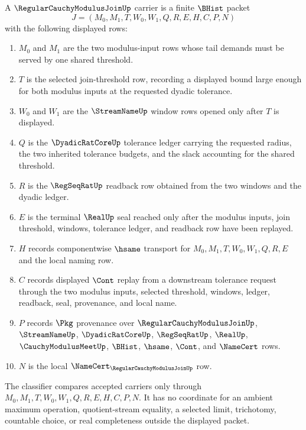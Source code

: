 \begin{definition}
\label{def:regular-cauchy-modulus-join-carrier}
A $\RegularCauchyModulusJoinUp$ carrier is a finite $\BHist$ packet
$$
J=(M_0,M_1,T,W_0,W_1,Q,R,E,H,C,P,N)
$$
with the following displayed rows:
\begin{enumerate}
\item $M_0$ and $M_1$ are the two modulus-input rows whose tail demands must be served by one shared threshold.
\item $T$ is the selected join-threshold row, recording a displayed bound large enough for both modulus inputs at the requested dyadic tolerance.
\item $W_0$ and $W_1$ are the $\StreamNameUp$ window rows opened only after $T$ is displayed.
\item $Q$ is the $\DyadicRatCoreUp$ tolerance ledger carrying the requested radius, the two inherited tolerance budgets, and the slack accounting for the shared threshold.
\item $R$ is the $\RegSeqRatUp$ readback row obtained from the two windows and the dyadic ledger.
\item $E$ is the terminal $\RealUp$ seal reached only after the modulus inputs, join threshold, windows, tolerance ledger, and readback row have been replayed.
\item $H$ records componentwise $\hsame$ transport for $M_0,M_1,T,W_0,W_1,Q,R,E$ and the local naming row.
\item $C$ records displayed $\Cont$ replay from a downstream tolerance request through the two modulus inputs, selected threshold, windows, ledger, readback, seal, provenance, and local name.
\item $P$ records $\Pkg$ provenance over $\RegularCauchyModulusJoinUp$, $\StreamNameUp$, $\DyadicRatCoreUp$, $\RegSeqRatUp$, $\RealUp$, $\CauchyModulusMeetUp$, $\BHist$, $\hsame$, $\Cont$, and $\NameCert$ rows.
\item $N$ is the local $\NameCert_{\RegularCauchyModulusJoinUp}$ row.
\end{enumerate}
The classifier compares accepted carriers only through $M_0,M_1,T,W_0,W_1,Q,R,E,H,C,P,N$. It has no coordinate for an ambient maximum operation, quotient-stream equality, a selected limit, trichotomy, countable choice, or real completeness outside the displayed packet.
\end{definition}

